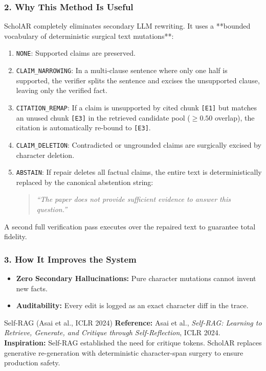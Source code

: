 \documentclass[11pt,a4paper]{article}
\begin{document}
\subsubsection{2. Why This Method Is Useful}
ScholAR completely eliminates secondary LLM rewriting. It uses a **bounded vocabulary of deterministic surgical text mutations**:
\begin{enumerate}[leftmargin=*]
    \item \texttt{NONE}: Supported claims are preserved.
    \item \texttt{CLAIM\_NARROWING}: In a multi-clause sentence where only one half is supported, the verifier splits the sentence and excises the unsupported clause, leaving only the verified fact.
    \item \texttt{CITATION\_REMAP}: If a claim is unsupported by cited chunk \texttt{[E1]} but matches an unused chunk \texttt{[E3]} in the retrieved candidate pool ($\ge 0.50$ overlap), the citation is automatically re-bound to \texttt{[E3]}.
    \item \texttt{CLAIM\_DELETION}: Contradicted or ungrounded claims are surgically excised by character deletion.
    \item \texttt{ABSTAIN}: If repair deletes all factual claims, the entire text is deterministically replaced by the canonical abstention string:
    \begin{quote}
    \emph{``The paper does not provide sufficient evidence to answer this question.''}
    \end{quote}
\end{enumerate}
A second full verification pass executes over the repaired text to guarantee total fidelity.

\subsubsection{3. How It Improves the System}
\begin{itemize}[leftmargin=*]
    \item \textbf{Zero Secondary Hallucinations:} Pure character mutations cannot invent new facts.
    \item \textbf{Auditability:} Every edit is logged as an exact character diff in the trace.
\end{itemize}

\begin{inspirationbox}{Self-RAG (Asai et al., ICLR 2024)}
\textbf{Reference:} Asai et al., \emph{Self-RAG: Learning to Retrieve, Generate, and Critique through Self-Reflection}, ICLR 2024.\\
\textbf{Inspiration:} Self-RAG established the need for critique tokens. ScholAR replaces generative re-generation with deterministic character-span surgery to ensure production safety.
\end{inspirationbox}
\end{document}
